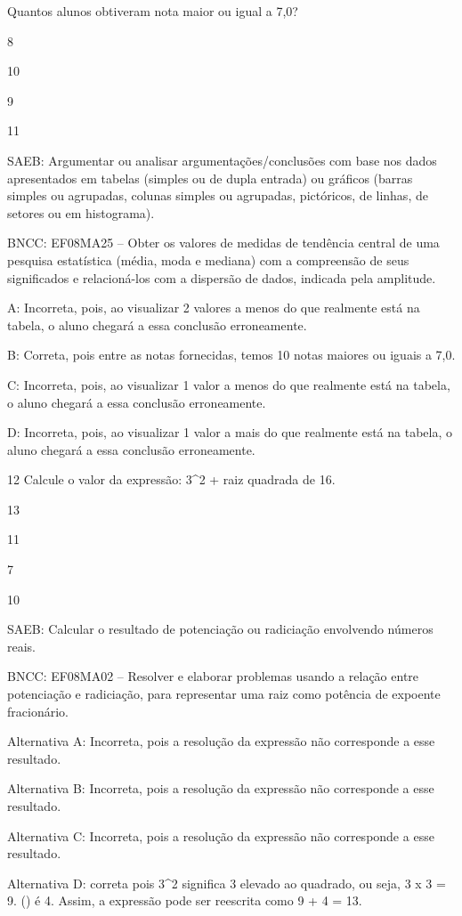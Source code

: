 {Quantos alunos obtiveram nota maior ou igual a 7,0?
\item 8
\item 10
\item 9
\item 11

SAEB: Argumentar ou analisar argumentações/conclusões com base nos dados
apresentados em tabelas (simples ou de dupla entrada) ou gráficos
(barras simples ou agrupadas, colunas simples ou agrupadas, pictóricos,
de linhas, de setores ou em histograma).

BNCC: EF08MA25 -- Obter os valores de medidas de tendência central de
uma pesquisa estatística (média, moda e mediana) com a compreensão de
seus significados e relacioná-los com a dispersão de dados, indicada
pela amplitude.

A: Incorreta, pois, ao visualizar 2 valores a menos do que realmente
está na tabela, o aluno chegará a essa conclusão erroneamente.

B: Correta, pois entre as notas fornecidas, temos 10 notas maiores ou
iguais a 7,0.

C: Incorreta, pois, ao visualizar 1 valor a menos do que realmente está
na tabela, o aluno chegará a essa conclusão erroneamente.

D: Incorreta, pois, ao visualizar 1 valor a mais do que realmente está
na tabela, o aluno chegará a essa conclusão erroneamente.

\num{12} Calcule o valor da expressão: 3^2 + raiz quadrada de 16.
\item 13
\item 11
\item 7
\item 10

SAEB: Calcular o resultado de potenciação ou radiciação envolvendo
números reais.

BNCC: EF08MA02 -- Resolver e elaborar problemas usando a relação entre
potenciação e radiciação, para representar uma raiz como potência de
expoente fracionário.

Alternativa A: Incorreta, pois a resolução da expressão não corresponde
a esse resultado.

Alternativa B: Incorreta, pois a resolução da expressão não corresponde
a esse resultado.

Alternativa C: Incorreta, pois a resolução da expressão não corresponde
a esse resultado.

Alternativa D: correta pois 3^2 significa 3 elevado ao quadrado, ou seja,
3 x 3 = 9. () é 4. Assim, a expressão pode ser reescrita como
9 + 4 = 13.

}
